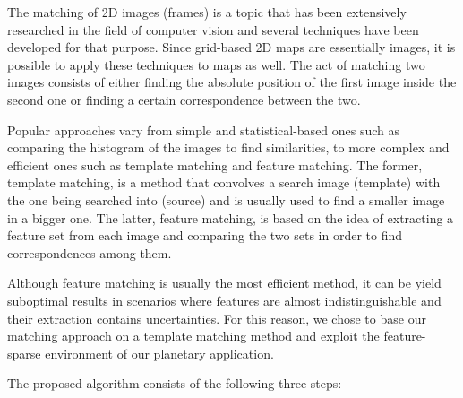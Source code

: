The matching of 2D images (frames) is a topic that has been extensively
researched in the field of computer vision and several techniques have
been developed for that purpose.
Since grid-based 2D maps are essentially images, it is possible to
apply these techniques to maps as well.
The act of matching two images consists of either finding the absolute
position of the first image inside the second one or finding a certain
correspondence between the two.

Popular approaches vary from simple and statistical-based ones such as
comparing the histogram of the images to find similarities, to
more complex and efficient ones such as template matching and feature
matching. The former, template matching, is a method that convolves a search
image (template) with the one being searched into (source) and is usually
used to find a smaller image in a bigger one.
The latter, feature matching, is based on the idea of extracting a feature
set from each image and comparing the two sets in order to find
correspondences among them.

Although feature matching is usually the most efficient method,
it can be yield suboptimal results in scenarios where features are
almost indistinguishable and their extraction contains uncertainties.
For this reason, we chose to base our matching approach on a
template matching method and exploit the feature-sparse environment
of our planetary application.

The proposed algorithm consists of the following three steps:

